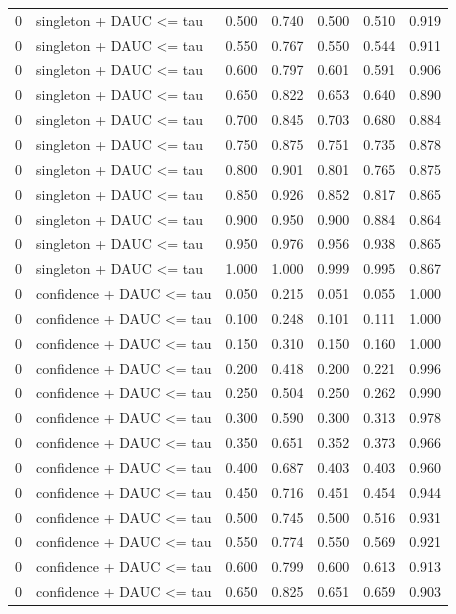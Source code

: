 \begin{tabular}{rlrrrrr}
0 & singleton + DAUC <= tau & 0.500 & 0.740 & 0.500 & 0.510 & 0.919 \\
0 & singleton + DAUC <= tau & 0.550 & 0.767 & 0.550 & 0.544 & 0.911 \\
0 & singleton + DAUC <= tau & 0.600 & 0.797 & 0.601 & 0.591 & 0.906 \\
0 & singleton + DAUC <= tau & 0.650 & 0.822 & 0.653 & 0.640 & 0.890 \\
0 & singleton + DAUC <= tau & 0.700 & 0.845 & 0.703 & 0.680 & 0.884 \\
0 & singleton + DAUC <= tau & 0.750 & 0.875 & 0.751 & 0.735 & 0.878 \\
0 & singleton + DAUC <= tau & 0.800 & 0.901 & 0.801 & 0.765 & 0.875 \\
0 & singleton + DAUC <= tau & 0.850 & 0.926 & 0.852 & 0.817 & 0.865 \\
0 & singleton + DAUC <= tau & 0.900 & 0.950 & 0.900 & 0.884 & 0.864 \\
0 & singleton + DAUC <= tau & 0.950 & 0.976 & 0.956 & 0.938 & 0.865 \\
0 & singleton + DAUC <= tau & 1.000 & 1.000 & 0.999 & 0.995 & 0.867 \\
0 & confidence + DAUC <= tau & 0.050 & 0.215 & 0.051 & 0.055 & 1.000 \\
0 & confidence + DAUC <= tau & 0.100 & 0.248 & 0.101 & 0.111 & 1.000 \\
0 & confidence + DAUC <= tau & 0.150 & 0.310 & 0.150 & 0.160 & 1.000 \\
0 & confidence + DAUC <= tau & 0.200 & 0.418 & 0.200 & 0.221 & 0.996 \\
0 & confidence + DAUC <= tau & 0.250 & 0.504 & 0.250 & 0.262 & 0.990 \\
0 & confidence + DAUC <= tau & 0.300 & 0.590 & 0.300 & 0.313 & 0.978 \\
0 & confidence + DAUC <= tau & 0.350 & 0.651 & 0.352 & 0.373 & 0.966 \\
0 & confidence + DAUC <= tau & 0.400 & 0.687 & 0.403 & 0.403 & 0.960 \\
0 & confidence + DAUC <= tau & 0.450 & 0.716 & 0.451 & 0.454 & 0.944 \\
0 & confidence + DAUC <= tau & 0.500 & 0.745 & 0.500 & 0.516 & 0.931 \\
0 & confidence + DAUC <= tau & 0.550 & 0.774 & 0.550 & 0.569 & 0.921 \\
0 & confidence + DAUC <= tau & 0.600 & 0.799 & 0.600 & 0.613 & 0.913 \\
0 & confidence + DAUC <= tau & 0.650 & 0.825 & 0.651 & 0.659 & 0.903 \\

\end{tabular}
